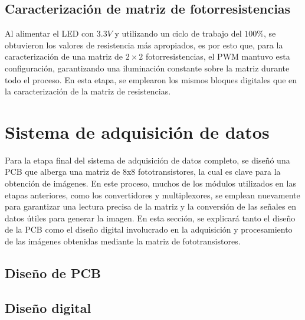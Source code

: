 \subsection{Caracterización de matriz de fotorresistencias}
Al alimentar el LED con $3.3V$ y utilizando un ciclo de trabajo del $100\%$, se obtuvieron los valores de resistencia más apropiados, es por esto que, para la caracterización de una matriz de $2\times2$ fotorresistencias, el PWM mantuvo esta configuración, garantizando una iluminación constante sobre la matriz durante todo el proceso. En esta etapa, se emplearon los mismos bloques digitales que en la caracterización de la matriz de resistencias.

\section{Sistema de adquisición de datos}
Para la etapa final del sistema de adquisición de datos completo, se diseñó una PCB que alberga una matriz de 8x8 fototransistores, la cual es clave para la obtención de imágenes. En este proceso, muchos de los módulos utilizados en las etapas anteriores, como los convertidores y multiplexores, se emplean nuevamente para garantizar una lectura precisa de la matriz y la conversión de las señales en datos útiles para generar la imagen. En esta sección, se explicará tanto el diseño de la PCB como el diseño digital involucrado en la adquisición y procesamiento de las imágenes obtenidas mediante la matriz de fototransistores.

\subsection{Diseño de PCB}

\subsection{Diseño digital}


